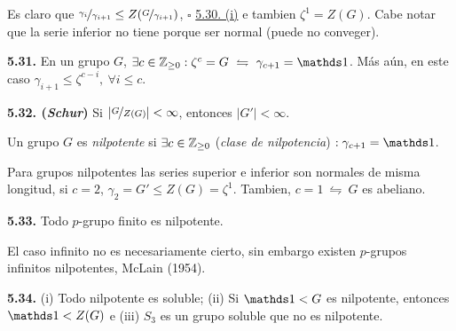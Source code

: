 \begin{note}
    Es claro que \(\nicefrac{\gamma_i}{\gamma_{i+1}}\leq Z(\nicefrac{G}{\gamma_{i+1}})\), {\scriptsize \(\square\)} \hyperlink{lemma530}{5.30. (i)} e tambien \(\zeta^1 = Z(G)\). Cabe notar que la serie inferior no tiene porque ser normal (puede no conveger). 
\end{note}

\hypertarget{thm531}{}
\begin{theorem}
    \textbf{5.31.} En un grupo \(G\), \(\exists c \in \Z_{\geq 0} : \zeta^c = G \ \leftrightharpoons \ \gamma_{c+1}= \id \). Más aún, en este caso \(\gamma_{i+1} \leq \zeta^{c-i}, \ \forall i \leq c\). 
\end{theorem}

\begin{theorem}
    \textbf{5.32. (\emph{Schur})} Si \(|\nicefrac{G}{Z(G)}|< \infty\), entonces \(|G'| < \infty\).   
\end{theorem}

\begin{definition}
    Un grupo \(G\) es \emph{nilpotente} si \(\exists c \in \mathbb{Z}_{\geq 0} \) (\emph{clase de nilpotencia}) \(: \gamma_{c+1} = \id\).
\end{definition}

\begin{note}
    Para grupos nilpotentes las series superior e inferior son normales de misma longitud, si \(c= 2\), \(\gamma_2 = G' \leq Z(G) = \zeta^1\). Tambien, \(c = 1 \ \leftrightharpoons \ G\) es abeliano.
\end{note}

\hypertarget{thm533}{}
\begin{theorem}
    \textbf{5.33.} Todo \(p\)-grupo finito es nilpotente. 
\end{theorem}

\begin{note}
    El caso infinito no es necesariamente cierto, sin embargo existen $p$-grupos infinitos nilpotentes, McLain (1954). %
\end{note}

\begin{theorem}
    \textbf{5.34.} (i) Todo nilpotente es soluble; (ii) Si \(\id < G\) es nilpotente, entonces \(\id < Z(G)\) e (iii) \(S_3\) es un grupo soluble que no es nilpotente. 
\end{theorem}

